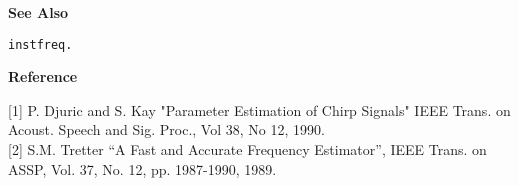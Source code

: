 {\bf \large \sf See Also}\\
\hspace*{1.5cm}
\begin{minipage}[t]{13.5cm}
\begin{verbatim}
instfreq.
\end{verbatim}
\end{minipage}
\vspace*{.5cm}


{\bf \large \sf Reference}\\
\hspace*{1.5cm}
\begin{minipage}[t]{13.5cm}
[1] P. Djuric and S. Kay "Parameter Estimation of Chirp Signals"
IEEE Trans. on Acoust. Speech and Sig. Proc., Vol 38, No 12, 1990.\\

[2] S.M. Tretter ``A Fast and Accurate Frequency Estimator'', IEEE
Trans. on ASSP, Vol. 37, No. 12, pp. 1987-1990, 1989.
\end{minipage}
